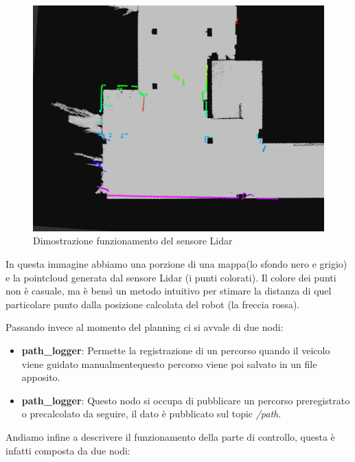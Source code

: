 \begin{figure}[H]
  \centering
  \includegraphics[width=1\textwidth]{figures/lidar_map.png}
  \caption{Dimostrazione funzionamento del sensore Lidar}
  \label{Dimostrazione funzionamento del sensore Lidar}
\end{figure}

\noindent In questa immagine abbiamo una porzione di una mappa(lo sfondo nero e grigio) e la pointcloud generata dal sensore Lidar (i punti colorati). Il colore dei punti non è casuale, ma è bensì un metodo intuitivo per stimare la distanza di quel particolare punto dalla posizione calcolata del robot (la freccia rossa).

\noindent Passando invece al momento del planning ci si avvale di due nodi:

\begin{itemize}
  \item \textbf{path\_logger}: Permette la registrazione di un percorso quando il veicolo viene guidato manualmentequesto percorso viene poi salvato in un file apposito.
  \item \textbf{path\_logger}: Questo nodo si occupa di pubblicare un percorso preregistrato o precalcolato da seguire, il dato è pubblicato sul topic \textit{/path}.  
\end{itemize}

\noindent Andiamo infine a descrivere il funzionamento della parte di controllo, questa è infatti composta da due nodi:

